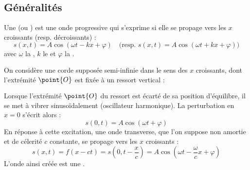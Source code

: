 \subsection{Généralités}

\begin{definition}
Une  (ou ) est une onde progressive qui s'exprime si elle se propage vers les $x$ croissants (resp. décroissants) :
\[s(x, t) = A \cos(\omega t - kx + \varphi) \quad \text{(resp. } s(x, t) = A \cos(\omega t + kx + \varphi) \text{)}\]
avec $\omega$ la , $k$ le  et $\varphi$ la .
\end{definition}

\begin{exemple}
On considère une corde supposée semi-infinie dans le sens des $x$ croissants, dont l'extrémité $\point{O}$ est fixée à un ressort vertical :

\begin{figure}[H]
\begin{center}
\end{center}
\end{figure}

\noindent Lorsque l'extrémité $\point{O}$ du ressort est écarté de sa position d'équilibre, il se met à vibrer sinusoïdalement (oscillateur harmonique). La perturbation en $x = 0$ s'écrit alors :
\[s(0, t) = A \cos(\omega t + \varphi)\]
En réponse à cette excitation, une onde transverse, que l'on suppose non amortie et de célerité $c$ constante, se propage vers les $x$ croissants :
\[s(x, t) = f(x - ct) = s\left(0, t - \frac{x}{c}\right) = A \cos\left(\omega t - \frac{\omega}{c} x + \varphi\right)\]
L'onde ainsi créée est une .
\end{exemple}

